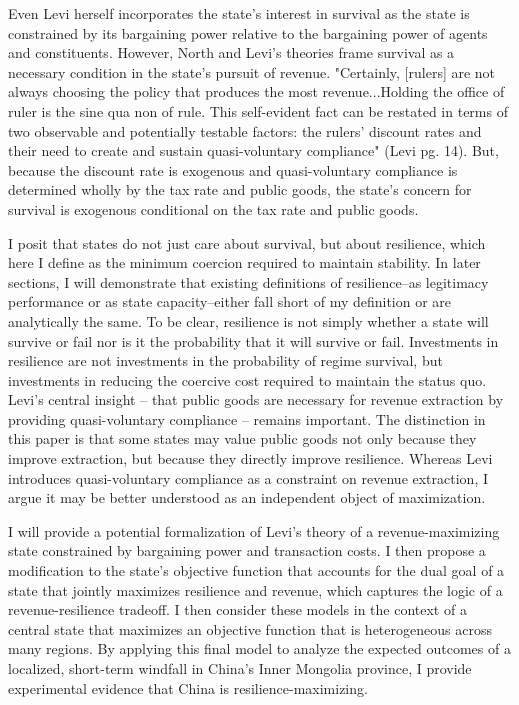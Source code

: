 \documentclass[bibtex,nonblind]{apsr_submission}
\begin{document}
Even Levi herself incorporates the state's interest in survival as the state is constrained by its bargaining power relative to the bargaining power of agents and constituents. However, North and Levi's theories frame survival as a necessary condition in the state's pursuit of revenue. "Certainly, [rulers] are not always choosing the policy that produces the most revenue...Holding the office of ruler is the sine qua non of rule. This self-evident fact can be restated in terms of two observable and potentially testable factors: the rulers' discount rates and their need to create and sustain quasi-voluntary compliance" (Levi pg. 14). But, because the discount rate is exogenous and quasi-voluntary compliance is determined wholly by the tax rate and public goods, the state's concern for survival is exogenous conditional on the tax rate and public goods.

I posit that states do not just care about survival, but about resilience, which here I define as the minimum coercion required to maintain stability. In later sections, I will demonstrate that existing definitions of resilience--as legitimacy performance or as state capacity--either fall short of my definition or are analytically the same. To be clear, resilience is not simply whether a state will survive or fail nor is it the probability that it will survive or fail. Investments in resilience are not investments in the probability of regime survival, but investments in reducing the coercive cost required to maintain the status quo. Levi's central insight -- that public goods are necessary for revenue extraction by providing quasi-voluntary compliance -- remains important. The distinction in this paper is that some states may value public goods not only because they improve extraction, but because they directly improve resilience. Whereas Levi introduces quasi-voluntary compliance as a constraint on revenue extraction, I argue it may be better understood as an independent object of maximization.

I will provide a potential formalization of Levi's theory of a revenue-maximizing state constrained by bargaining power and transaction costs. I then propose a modification to the state's objective function that accounts for the dual goal of a state that jointly maximizes resilience and revenue, which captures the logic of a revenue-resilience tradeoff. I then consider these models in the context of a central state that maximizes an objective function that is heterogeneous across many regions. By applying this final model to analyze the expected outcomes of a localized, short-term windfall in China's Inner Mongolia province, I provide experimental evidence that China is resilience-maximizing.
\end{document}
